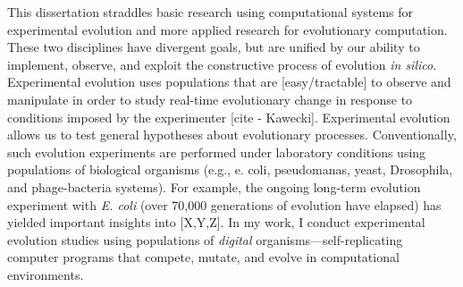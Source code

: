 



This dissertation straddles basic research using computational systems for experimental evolution and more applied research for evolutionary computation.
These two disciplines have divergent goals, but are unified by our ability to implement, observe, and exploit the constructive process of evolution \textit{in silico}.
Experimental evolution uses populations that are [easy/tractable] to observe and manipulate in order to study real-time evolutionary change in response to conditions imposed by the experimenter [cite - Kawecki].
Experimental evolution allows us to test general hypotheses about evolutionary processes. 
Conventionally, such evolution experiments are performed under laboratory conditions using populations of biological organisms (e.g., e. coli, pseudomanas, yeast, Drosophila, and phage-bacteria systems). 
For example, the ongoing long-term evolution experiment with \textit{E. coli} (over 70,000 generations of evolution have elapsed) has yielded important insights into [X,Y,Z].
In my work, I conduct experimental evolution studies using populations of \textit{digital} organisms---self-replicating computer programs that compete, mutate, and evolve in computational environments.


